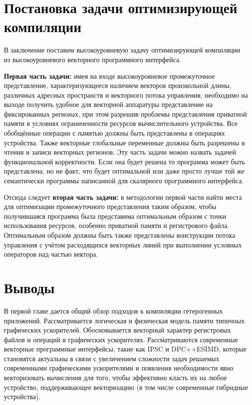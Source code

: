 \section{Постановка задачи оптимизирующей компиляции}\label{sec:overview/howtobetter}

В заключение поставим высокоуровневую задачу оптимизирующей компиляции из высокоуровневого векторного программного интерфейса.

\textbf{Первая часть задачи:} имея на входе высокоуровневое промежуточное представление, характеризующееся наличием векторов произвольной длины, различных адресных пространств и векторного потока управления, необходимо на выходе получить удобное для векторной аппаратуры представление на фиксированных регионах, при этом разрешив проблемы представления приватной памяти в условиях ограниченности ресурсов вычислительного устройства. Все обобщённые операции с памятью должны быть представлены в операциях устройства. Также векторные глобальные переменные должны быть разрешены в чтения и записи векторных регионов. Эту часть задачи можно назвать задачей функциональной корректности. Если она будет решена то программа может быть представлена, но не факт, что будет оптимальной или даже просто лучше той же семантически программы написанной для скалярного программного интерфейса.

Отсюда следует \textbf{вторая часть задачи:} в методологии первой части найти места для оптимизации промежуточного представления таким образом, чтобы получившаяся программа была представима оптимальным образом с точки использования ресурсов, особенно приватной памяти и регистрового файла. Оптимальным образом должны быть также представлены конструкции потока управления с учётом расходящихся векторных линий при выполнении условных операторов над частью вектора.

\section{Выводы}\label{sec:overview/outcome}

В первой главе дается общий обзор подходов к компиляции гетерогенных приложений. Рассматривается логическая и физическая модель памяти типичных графических ускорителей. Обосновывается векторный характер регистровых файлов и операций в графических ускорителях. Рассматриваются современные векторные программные интерфейсы, такие как IPSC и DPC++ESIMD, которые становятся актуальны в связи с увеличением сложности задач решаемых современными графическими ускорителями и появления необходимости явно векторизовать вычисления для того, чтобы эффективно класть их на любое устройство, поддерживающее векторизацию (в том числе современные гибридные устройства). 

